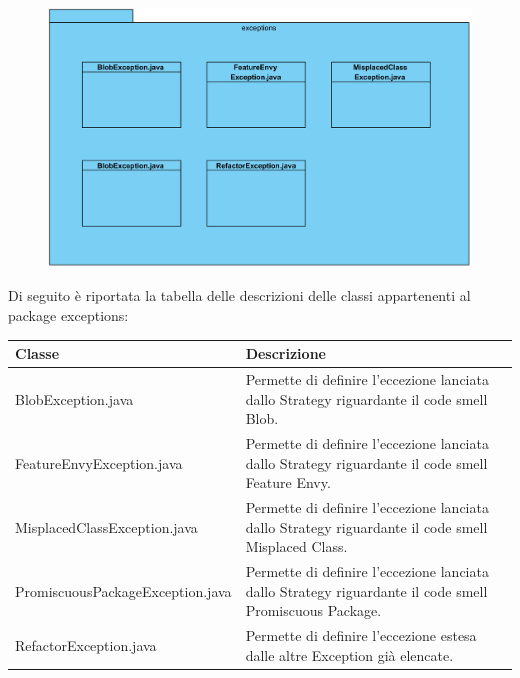 \documentclass[11pt]{article}
\begin{document}
			\begin{description}
				\newpage
				\item[ 2.1.4.1 Package exceptions]
				\item \begin{figure}[!h]
					\centering
					\includegraphics[width=15cm]{diagrams/ExceptionPackageDiagram}
				\end{figure}
				Di seguito è riportata la tabella delle descrizioni delle classi appartenenti al package exceptions:
				\item \begin{tabular}{|p{}|p{}|}
					\hline
					\textbf{Classe} & \textbf{Descrizione}\\
					\hline
					BlobException.java  & Permette di definire l'eccezione lanciata dallo Strategy riguardante il code smell Blob. \\
					\hline
					FeatureEnvyException.java  & Permette di definire l'eccezione lanciata dallo Strategy riguardante il code smell Feature Envy. \\
					\hline
					MisplacedClassException.java  & Permette di definire l'eccezione lanciata dallo Strategy riguardante il code smell Misplaced Class. \\
					\hline
					PromiscuousPackageException.java  & Permette di definire l'eccezione lanciata dallo Strategy riguardante il code smell Promiscuous Package. \\
					\hline
					RefactorException.java  & Permette di definire l'eccezione estesa dalle altre Exception già elencate. \\
					\hline
				\end{tabular}
				

\end{description}
\end{document}
